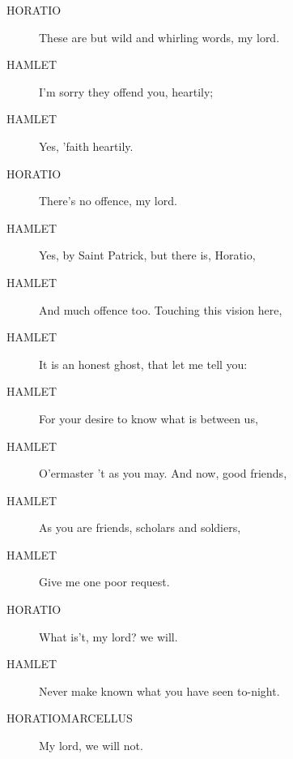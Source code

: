 \documentclass{article}
\begin{document}
\begin{description}
            
\item[HORATIO] These are but wild and whirling words, my lord.
\end{description}
          
\begin{description}
            
\item[HAMLET] I'm sorry they offend you, heartily;
\item[HAMLET] Yes, 'faith heartily.
\end{description}
          
\begin{description}
            
\item[HORATIO] There's no offence, my lord.
\end{description}
          
\begin{description}
            
\item[HAMLET] Yes, by Saint Patrick, but there is, Horatio,
\item[HAMLET] And much offence too. Touching this vision here,
\item[HAMLET] It is an honest ghost, that let me tell you:
\item[HAMLET] For your desire to know what is between us,
\item[HAMLET] O'ermaster 't as you may. And now, good friends,
\item[HAMLET] As you are friends, scholars and soldiers,
\item[HAMLET] Give me one poor request.
\end{description}
          
\begin{description}
            
\item[HORATIO] What is't, my lord? we will.
\end{description}
          
\begin{description}
            
\item[HAMLET] Never make known what you have seen to-night.
\end{description}
          
\begin{description}
            
\item[HORATIOMARCELLUS] My lord, we will not.
\end{description}
          
\end{document}
